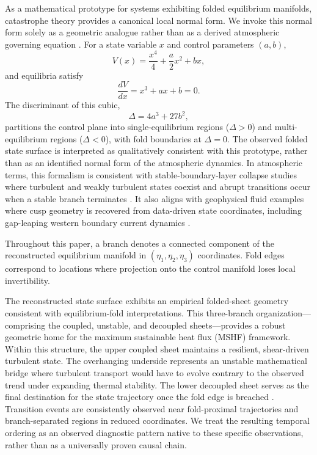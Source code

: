 \documentclass[12pt,a4paper]{article}
\begin{document}
As a mathematical prototype for systems exhibiting folded equilibrium manifolds, catastrophe theory provides a canonical local normal form. We invoke this normal form solely as a geometric analogue rather than as a derived atmospheric governing equation \citep{thom1975, zeeman1977, poston1978}. For a state variable $x$ and control parameters $(a,b)$,
\begin{equation}
V(x) = \frac{x^4}{4} + \frac{a}{2}x^2 + bx,
\end{equation}
and equilibria satisfy
\begin{equation}
\frac{dV}{dx} = x^3 + ax + b = 0.
\end{equation}
The discriminant of this cubic,
\begin{equation}
\Delta = 4a^3 + 27b^2,
\end{equation}
partitions the control plane into single-equilibrium regions ($\Delta > 0$) and multi-equilibrium regions ($\Delta < 0$), with fold boundaries at $\Delta = 0$. The observed folded state surface is interpreted as qualitatively consistent with this prototype, rather than as an identified normal form of the atmospheric dynamics. In atmospheric terms, this formalism is consistent with stable-boundary-layer collapse studies where turbulent and weakly turbulent states coexist and abrupt transitions occur when a stable branch terminates \citep{van2007regime, vandewiel2017, stull1993catastrophe}. It also aligns with geophysical fluid examples where cusp geometry is recovered from data-driven state coordinates, including gap-leaping western boundary current dynamics \citep{KuehlSheremet2009}.

Throughout this paper, a branch denotes a connected component of the reconstructed equilibrium manifold in $(\eta_1,\eta_2,\eta_3)$ coordinates. Fold edges correspond to locations where projection onto the control manifold loses local invertibility.

The reconstructed state surface exhibits an empirical folded-sheet geometry consistent with equilibrium-fold interpretations. This three-branch organization---comprising the coupled, unstable, and decoupled sheets---provides a robust geometric home for the maximum sustainable heat flux (MSHF) framework. Within this structure, the upper coupled sheet maintains a resilient, shear-driven turbulent state. The overhanging underside represents an unstable mathematical bridge where turbulent transport would have to evolve contrary to the observed trend under expanding thermal stability. The lower decoupled sheet serves as the final destination for the state trajectory once the fold edge is breached \citep{vandewiel2017, mcnider1995}. Transition events are consistently observed near fold-proximal trajectories and branch-separated regions in reduced coordinates. We treat the resulting temporal ordering as an observed diagnostic pattern native to these specific observations, rather than as a universally proven causal chain.
\end{document}
